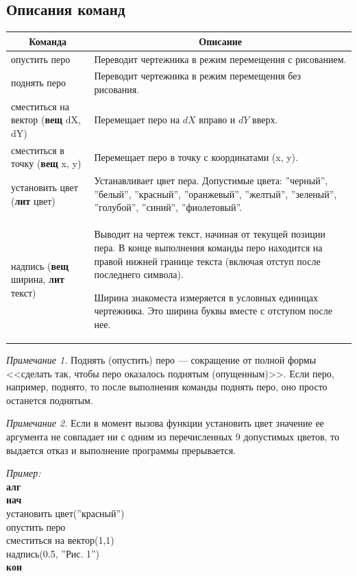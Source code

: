 \subsection{Описания команд}
\begin{center}
\begin{tabular}{||p{4cm}|p{12cm}||}
\hline
\hline
\multicolumn{1}{||c|}{\bfseries Команда} & \multicolumn{1}{|c||}{\bfseries Описание}\\
\hline
	опустить перо &
	Переводит чертежника в режим перемещения с рисованием.\\
\hline
	поднять перо &
	Переводит чертежника в режим перемещения без рисования.\\
\hline
	сместиться на вектор (\textbf{вещ} dX, dY) &
	Перемещает перо на $dX$ вправо и $dY$ вверх.\\
\hline
	сместиться в точку (\textbf{вещ} x, y) &
	Перемещает перо в точку с координатами (x, y).\\
\hline
	установить цвет (\textbf{лит} цвет) &
	Устанавливает цвет пера. \footnotesize Допустимые цвета: ''черный'', ''белый'', ''красный'', ''оранжевый'', ''желтый'', ''зеленый'', ''голубой'', ''синий'', ''фиолетовый''.\\
\hline
\raggedright надпись (\textbf{вещ} \mbox{ширина}, \textbf{лит} текст) &
\small Выводит на чертеж текст, начиная от текущей позиции пера. В конце выполнения команды перо находится на правой нижней границе текста (включая отступ после последнего символа).

Ширина знакоместа измеряется в условных единицах чертежника. Это ширина буквы вместе с отступом после нее.\\
\hline
\hline
\end{tabular}
\end{center}

\emph{Примечание 1.} Поднять (опустить) перо --- сокращение от полной формы <<сделать так, чтобы перо оказалось поднятым (опущенным)>>. Если перо, например, поднято, то после выполнения команды \textsf{поднять перо}, оно просто останется поднятым.

\emph{Примечание 2.} Если в момент вызова функции \textsf{установить цвет} значение ее аргумента не совпадает ни с одним из перечисленных 9 допустимых цветов, то выдается отказ и выполнение программы прерывается.

\emph{Пример:}\\
{\sffamily
\textbf{алг}\\
\textbf{нач}\\
\otstup установить цвет(''красный'')\\
\otstup опустить перо\\
\otstup сместиться на вектор(1,1)\\
\otstup надпись(0.5, ''Рис. 1'')\\
\textbf{кон}
}

